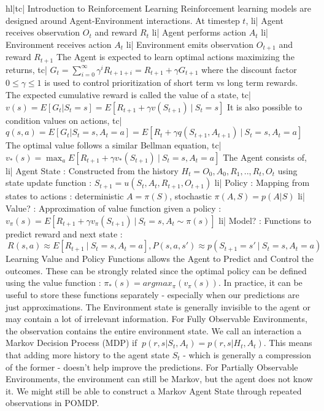 hl|tc| Introduction to Reinforcement Learning
Reinforcement learning models are designed around Agent-Environment interactions. At timestep \(t\),
li| Agent receives observation \(O_t\) and reward \(R_t\)
li| Agent performs action \(A_t\)
li| Environment receives action \(A_t\)
li| Environment emits observation \(O_{t+1}\) and reward \(R_{t+1}\)
The Agent is expected to learn optimal actions maximizing the returns,
tc| \(G_t = \sum_{i=0}^{\infty}\gamma^i R_{t+1+i} = R_{t+1} + \gamma G_{t+1} \)
where the discount factor \(0\le \gamma \le 1\) is used to control prioritization of short term vs long term rewards.
The expected cumulative reward is called the value of a state,
tc| \(v(s) = E[G_t | S_t = s] = E[R_{t+1} + \gamma v(S_{t+1}) \ | \ S_t = s] \)
It is also possible to condition values on actions,
tc| \(q(s, a) = E[G_t | S_t = s, A_t = a] = E[R_t + \gamma q(S_{t+1}, A_{t+1}) \ | \ S_t = s, A_t = a] \)
The optimal value follows a similar Bellman equation,
tc| \(v_*(s) = \max_a E[R_{t+1} + \gamma v_*(S_{t+1}) \ | \ S_t = s, A_t = a] \)
The Agent consists of,
li| Agent State : Constructed from the history \(H_t = O_0, A_0, R_1, .., R_t, O_t \) using state update function : \(S_{t+1} = u(S_t, A_t, R_{t+1}, O_{t+1}) \)
li| Policy : Mapping from states to actions : deterministic \( A = \pi(S) \), stochastic \( \pi(A, S) = p(A|S) \)
li| Value? : Approximation of value function given a policy : \(v_\pi(s) = E[R_{t+1} + \gamma v_\pi(S_{t+1}) \ | \ S_t = s, A_t \sim \pi(s) ] \)
li| Model? : Functions to predict reward and next state : \( \ R(s, a) \approx E[R_{t+1} \ | \ S_t = s, A_t = a], P(s, a, s') \approx p(S_{t+1} = s' \ | \ S_t = s, A_t = a) \)
Learning Value and Policy Functions allows the Agent to Predict and Control the outcomes. These can be strongly related since the optimal policy can be defined using the value function : \( \pi_*(s) = argmax_\pi (v_\pi(s)) \). In practice, it can be useful to store these functions separately - especially when our predictions are just approximations.
The Environment state is generally invisible to the agent or may contain a lot of irrelevant information. For Fully Observable Environments, the observation contains the entire environment state.
We call an interaction a Markov Decision Process (MDP) if \(\ p(r, s | S_t, A_t) = p(r, s | H_t, A_t) \). This means that adding more history to the agent state \(S_t\) - which is generally a compression of the former - doesn't help improve the predictions.
For Partially Observable Environments, the environment can still be Markov, but the agent does not know it. We might still be able to construct a Markov Agent State through repeated observations in POMDP.
